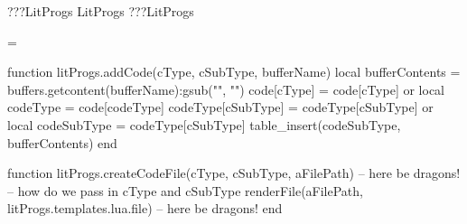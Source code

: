 
\startchapter[title=The capture and manipulation of code]

\startMkIVCode


\installcommandhandler \????LitProgs {LitProgs} \????LitProgs

\appendtoks
  =
\to \everydefineLitProgs

\def\addLitProgsCode{%
  \directlua{thirddata.literateProgs.addCode(\currentLitProgs,
                                             \somethingelse,
                                             '_typing_')}
}

\def\createLitProgsFile{%
  \directlua{thirddata.literateProgs.createCodeFile(\currentLitProgs,
                                                    \somethingElse,
                                                    '#1')}
}

\stopMkIVCode

\startLuaCode

function litProgs.addCode(cType, cSubType, bufferName)
  local bufferContents = buffers.getcontent(bufferName):gsub("", "\n")
  code[cType]          = code[cType] or { }
  local codeType       = code[codeType]
  codeType[cSubType]   = codeType[cSubType] or { }
  local codeSubType    = codeType[cSubType]
  table_insert(codeSubType, bufferContents)
end

function litProgs.createCodeFile(cType, cSubType, aFilePath)
  -- here be dragons! -- how do we pass in cType and cSubType
  renderFile(aFilePath, litProgs.templates.lua.file)
  -- here be dragons!
end


\stopLuaCode

\stopchapter